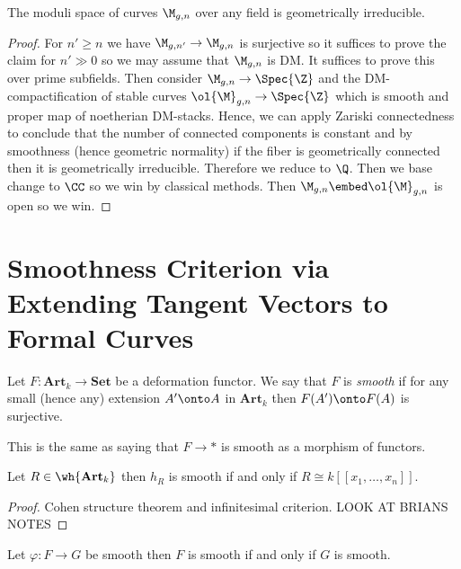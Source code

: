 \documentclass[12pt]{article}
\begin{document}
\begin{theorem}
The moduli space of curves $\M_{g,n}$ over any field is geometrically irreducible.
\end{theorem}

\begin{proof}
For $n' \ge n$ we have $\M_{g,n'} \to \M_{g,n}$ is surjective so it suffices to prove the claim for $n' \gg 0$ so we may assume that $\M_{g,n}$ is DM.
It suffices to prove this over prime subfields. Then consider $\M_{g,n} \to \Spec{\Z}$ and the DM-compactification of stable curves $\ol{\M}_{g,n} \to \Spec{\Z}$ which is smooth and proper map of noetherian DM-stacks. Hence, we can apply Zariski connectedness to conclude that the number of connected components is constant and by smoothness (hence geometric normality) if the fiber is geometrically connected then it is geometrically irreducible. Therefore we reduce to $\Q$. Then we base change to $\CC$ so we win by classical methods. Then $\M_{g,n} \embed \ol{\M}_{g,n}$ is open so we win.
\end{proof}

\section{Smoothness Criterion via Extending Tangent Vectors to Formal Curves}

\newcommand{\Art}{\mathbf{Art}}
\newcommand{\Set}{\mathbf{Set}}

\begin{defn}
Let $F : \Art_k \to \Set$ be a deformation functor. We say that $F$ is \textit{smooth} if for any small (hence any) extension $A' \onto A$ in $\Art_k$ then $F(A') \onto F(A)$ is surjective. 
\end{defn}

\begin{rmk}
This is the same as saying that $F \to *$ is smooth as a morphism of functors.
\end{rmk}

\begin{lemma}
Let $R \in \wh{\Art_k}$ then $h_R$ is smooth if and only if $R \cong k[[x_1, \dots, x_n]]$.
\end{lemma}

\begin{proof}
Cohen structure theorem and infinitesimal criterion. {\color{red} LOOK AT BRIANS NOTES}
\end{proof}

\begin{lemma}
Let $\varphi : F \to G$ be smooth then $F$ is smooth if and only if $G$ is smooth.
\end{lemma}
\end{document}
